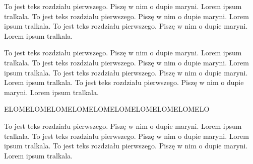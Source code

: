 \documentclass[test.tex]{subfiles}
\begin{document}
To jest teks rozdziału pierwszego. Piszę w nim o dupie maryni.
Lorem ipsum tralkala. To jest teks rozdziału pierwszego. Piszę w nim o dupie maryni.
Lorem ipsum tralkala. To jest teks rozdziału pierwszego. Piszę w nim o dupie maryni.
Lorem ipsum tralkala. 



To jest teks rozdziału pierwszego. Piszę w nim o dupie maryni.
Lorem ipsum tralkala. To jest teks rozdziału pierwszego. Piszę w nim o dupie maryni.
Lorem ipsum tralkala. 
To jest teks rozdziału pierwszego. Piszę w nim o dupie maryni.
Lorem ipsum tralkala. To jest teks rozdziału pierwszego. Piszę w nim o dupie maryni.
Lorem ipsum tralkala.  

ELOMELOMELOMELOMELOMELOMELOMELOMELOMELO


To jest teks rozdziału pierwszego. Piszę w nim o dupie maryni.
Lorem ipsum tralkala. To jest teks rozdziału pierwszego. Piszę w nim o dupie maryni.
Lorem ipsum tralkala. To jest teks rozdziału pierwszego. Piszę w nim o dupie maryni.
Lorem ipsum tralkala. 
\end{document}
